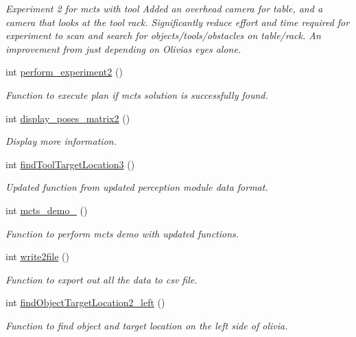 \begin{DoxyCompactItemize}
\begin{DoxyCompactList}\small\item\em Experiment 2 for mcts with tool Added an overhead camera for table, and a camera that looks at the tool rack. Significantly reduce effort and time required for experiment to scan and search for objects/tools/obstacles on table/rack. An improvement from just depending on Olivia\textquotesingle{}s eyes alone. \end{DoxyCompactList}\item 
int \hyperlink{structManipulate_aabfbcf8aba7c38776bc37db8d01508d6}{perform\+\_\+experiment2} ()
\begin{DoxyCompactList}\small\item\em Function to execute plan if mcts solution is successfully found. \end{DoxyCompactList}\item 
int \hyperlink{structManipulate_aff548e55e9bbfb49459a8b9b419b4dbe}{display\+\_\+poses\+\_\+matrix2} ()
\begin{DoxyCompactList}\small\item\em Display more information. \end{DoxyCompactList}\item 
int \hyperlink{structManipulate_aeb62b4d4b898f5a403e75ada463bbeb4}{find\+Tool\+Target\+Location3} ()
\begin{DoxyCompactList}\small\item\em Updated function from updated perception module data format. \end{DoxyCompactList}\item 
int \hyperlink{structManipulate_a49b4ba7bd0c11a5abe4dcfc3f0f7af0e}{mcts\+\_\+demo\+\_} ()
\begin{DoxyCompactList}\small\item\em Function to perform mcts demo with updated functions. \end{DoxyCompactList}\item 
int \hyperlink{structManipulate_a4496399bd56cc674257ab8a44c991647}{write2file} ()
\begin{DoxyCompactList}\small\item\em Function to export out all the data to csv file. \end{DoxyCompactList}\item 
int \hyperlink{structManipulate_a8763018283f744613d7d50e6e22a27cf}{find\+Object\+Target\+Location2\+\_\+left} ()
\begin{DoxyCompactList}\small\item\em Function to find object and target location on the left side of olivia. \end{DoxyCompactList}\item 

\end{DoxyCompactItemize}
